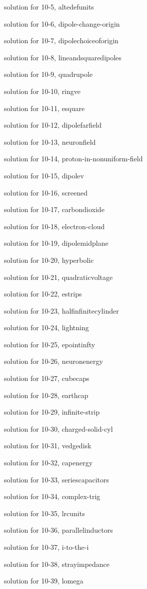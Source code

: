 \documentclass{problems}
\begin{document}
solution for 10-5, altedefunits

solution for 10-6, dipole-change-origin

solution for 10-7, dipolechoiceoforigin

solution for 10-8, lineandsquaredipoles

solution for 10-9, quadrupole

solution for 10-10, ringve

solution for 10-11, esquare

solution for 10-12, dipolefarfield

solution for 10-13, neuronfield

solution for 10-14, proton-in-nonuniform-field

solution for 10-15, dipolev

solution for 10-16, screened

solution for 10-17, carbondioxide

solution for 10-18, electron-cloud

solution for 10-19, dipolemidplane

solution for 10-20, hyperbolic

solution for 10-21, quadraticvoltage

solution for 10-22, estrips

solution for 10-23, halfinfinitecylinder

solution for 10-24, lightning

solution for 10-25, epointinfty

solution for 10-26, neuronenergy

solution for 10-27, cubecaps

solution for 10-28, earthcap

solution for 10-29, infinite-strip

solution for 10-30, charged-solid-cyl

solution for 10-31, vedgedisk

solution for 10-32, capenergy

solution for 10-33, seriescapacitors

solution for 10-34, complex-trig

solution for 10-35, lrcunits

solution for 10-36, parallelinductors

solution for 10-37, i-to-the-i

solution for 10-38, strayimpedance

solution for 10-39, lomega
\end{document}
